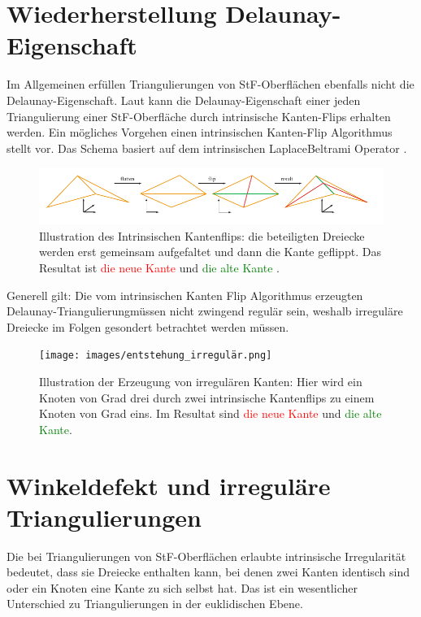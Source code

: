 \section*{Wiederherstellung Delaunay-Eigenschaft}
Im Allgemeinen erfüllen Triangulierungen von StF-Oberflächen ebenfalls nicht die Delaunay-Eigenschaft. Laut \citet{Bobenko:2007:LaplaceBeltrami} kann die Delaunay-Eigenschaft einer jeden Triangulierung einer StF-Oberfläche durch intrinsische Kanten-Flips erhalten werden.
Ein mögliches Vorgehen einen intrinsischen Kanten-Flip Algorithmus stellt \citet{Bobenko:2006:SIGGRAPH} vor. Das Schema basiert auf dem intrinsischen LaplaceBeltrami Operator \cite{Bobenko:2007:LaplaceBeltrami}.
 \begin{figure}[H]
    \centering
    \includegraphics[width=5in]{images/intrinische_Kantenflip.png}
    \caption{Illustration des Intrinsischen Kantenflips: die beteiligten Dreiecke werden erst gemeinsam  aufgefaltet und dann die Kante geflippt.  Das Resultat ist  \textcolor{red}{die neue Kante} und \textcolor{green}{die alte Kante}  \cite{Bobenko:2006:SIGGRAPH}. }%
\end{figure}
Generell gilt: Die vom intrinsischen Kanten Flip Algorithmus erzeugten Delaunay-Triangulierungmüssen nicht zwingend regulär sein, weshalb irreguläre Dreiecke im Folgen gesondert betrachtet werden müssen. 
 \begin{figure}[H]
    \centering
    \texttt{[image: images/entstehung\_irregulär.png]}
    \caption{Illustration der Erzeugung von irregulären Kanten: Hier wird ein Knoten von Grad drei durch zwei intrinsische Kantenflips zu einem Knoten von Grad eins. Im Resultat sind \textcolor{red}{die neue Kante} und \textcolor{green}{die alte Kante}\cite{Bobenko:2006:SIGGRAPH}. }%
\end{figure}



\section*{Winkeldefekt und irreguläre Triangulierungen}
Die bei Triangulierungen von StF-Oberflächen erlaubte intrinsische Irregularität bedeutet, dass sie Dreiecke enthalten kann, bei denen zwei Kanten identisch sind oder ein Knoten eine Kante zu sich selbst hat. Das ist ein wesentlicher Unterschied zu Triangulierungen in der euklidischen Ebene. \\

